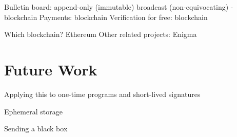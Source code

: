 Bulletin board: append-only (immutable) broadcast (non-equivocating) - blockchain
Payments: blockchain
Verification for free: blockchain

Which blockchain? Ethereum
Other related projects: Enigma

\section{Future Work}

Applying this to one-time programs and short-lived signatures

Ephemeral storage

Sending a black box

 

